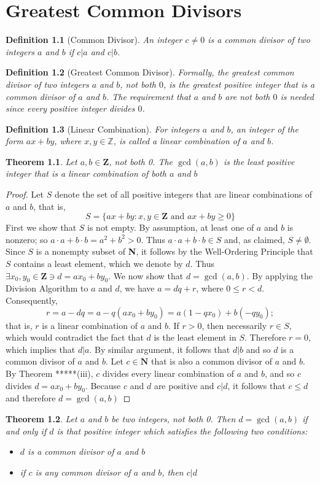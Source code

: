 \documentclass[10pt]{report}
\newtheorem{thm1}{Theorem}[chapter]
\newtheorem{def1}{Definition}[chapter]
\begin{document}
\chapter{Greatest Common Divisors}
\begin{def1}[Common Divisor]
An integer $c\neq 0$ is a common divisor of two integers $a$ and $b$ if $c|a$ and $c|b$.
\end{def1}
\begin{def1}[Greatest Common Divisor]
Formally, the greatest common divisor of two integers $a$ and $b$, not both $0$, is the greatest positive integer that is a common divisor of $a$ and $b$. The requirement that $a$ and $b$ are not both $0$ is needed since every positive integer divides $0$.
\end{def1}
\begin{def1}[Linear Combination]
For integers $a$ and $b$, an integer of the form $ax + by$, where $x,y\in\mathbb{Z}$, is called a linear combination of $a$ and $b$.
\end{def1}
\begin{thm1}
Let $a, b\in \textbf{Z}$, not both 0. The $\gcd(a,b)$ is the least positive integer that is a linear combination of both $a$ and $b$
\end{thm1}
\begin{proof}
Let $S$ denote the set of all positive integers that are linear combinations of $a$ and $b$, that is,
$$S=\{ax+by: x,y\in \textbf{Z} \text{ and } ax+by\geq 0\}$$
First we show that $S$ is not empty. By assumption, at least one of $a$ and $b$ is nonzero; so $a\cdot a+b\cdot b=a^2+b^2>0$. Thus $a\cdot a+b\cdot b\in S$ and, as claimed, $S\neq \emptyset$.\\
Since $S$ is a nonempty subset of \textbf{N}, it follows by the Well-Ordering Principle that $S$ contains a least element, which we denote by $d$. Thus $\exists x_0, y_0\in \textbf{Z}\ni d=ax_0+by_0$. We now show that $d=\gcd(a,b)$. By applying the Division Algorithm to $a$ and $d$, we have $a=dq+r$, where $0\leq r<d$. Consequently,
$$r=a-dq=a-q(ax_0+by_0)=a(1-qx_0)+b(-qy_0);$$
that is, $r$ is a linear combination of $a$ and $b$. If $r>0$, then necessarily $r\in S$, which would contradict the fact that $d$ is the least element in $S$. Therefore $r=0$, which implies that $d|a$. By similar argument, it follows that $d|b$ and so $d$ is a common divisor of $a$ and $b$. Let $c\in \textbf{N}$ that is also a common divisor of $a$ and $b$. By Theorem *****(iii), $c$ divides every linear combination of $a$ and $b$, and so $c$ divides $d=ax_0+by_0$. Because $c$ and $d$ are positive and $c|d$, it follows that $c\leq d$ and therefore $d=\gcd(a,b)$
\end{proof}
\begin{thm1}
Let $a$ and $b$ be two integers, not both 0. Then $d=\gcd(a,b)$ if and only if $d$ is that positive integer which satisfies the following two conditions:
\begin{itemize}
\item[(1)] $d$ is a common divisor of $a$ and $b$
\item[(2)] if $c$ is any common divisor of $a$ and $b$, then $c|d$
\end{itemize}
\end{thm1}
\end{document}

